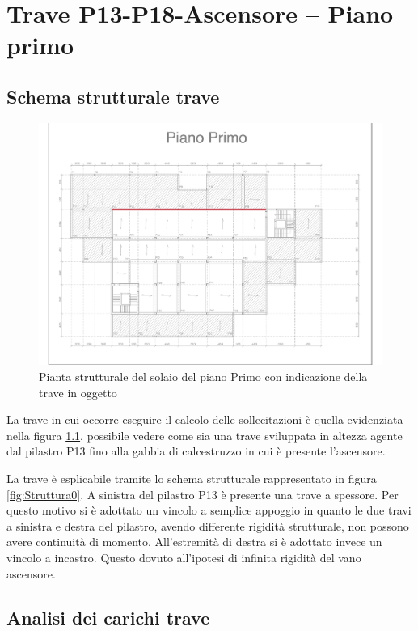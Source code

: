 \chapter{Trave P13-P18-Ascensore -- Piano primo}
\section{Schema strutturale trave}
\begin{figure}[htbp]
\centering
\includegraphics[trim=5.8cm 10.6cm 9.5cm 4.1cm,clip,frame,width=\textwidth]{IMG/Piante/Piante-Trave.pdf} 
\caption{Pianta strutturale del solaio del piano Primo con indicazione della trave in oggetto}
\label{fig:travePianta}
\end{figure}

La trave in cui occorre eseguire il calcolo delle sollecitazioni è quella evidenziata nella figura \ref{fig:travePianta}. 
\e possibile vedere come sia una trave sviluppata in altezza agente dal pilastro P13 fino alla gabbia di calcestruzzo in cui è presente l'ascensore.

La trave è esplicabile tramite lo schema strutturale rappresentato in figura \ref{fig:Struttura0}.
A sinistra del pilastro P13 è presente una trave a spessore. 
Per questo motivo si è adottato un vincolo a semplice appoggio in quanto le due travi a sinistra e destra del pilastro, avendo differente rigidità strutturale, non possono avere continuità di momento.
All'estremità di destra si è adottato invece un vincolo a incastro.
Questo dovuto all'ipotesi di infinita rigidità del vano ascensore.
\section{Analisi dei carichi trave}
